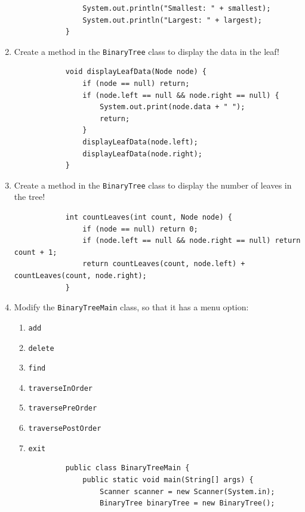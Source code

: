 \documentclass[12pt,titlepage]{article}
\begin{document}
\begin{enumerate}
{\begin{verbatim}
                System.out.println("Smallest: " + smallest);
                System.out.println("Largest: " + largest);
            }
        \end{verbatim}
    }
    \item {
        Create a method in the \texttt{BinaryTree} class to display the data in the leaf!

        \begin{verbatim}
            void displayLeafData(Node node) {
                if (node == null) return;
                if (node.left == null && node.right == null) {
                    System.out.print(node.data + " ");
                    return;
                }
                displayLeafData(node.left);
                displayLeafData(node.right);
            }
        \end{verbatim}
    }
    \pagebreak
    \item {
        Create a method in the \texttt{BinaryTree} class to display the number of leaves in the tree!

        \begin{verbatim}
            int countLeaves(int count, Node node) {
                if (node == null) return 0;
                if (node.left == null && node.right == null) return count + 1;
                return countLeaves(count, node.left) + countLeaves(count, node.right);
            }
        \end{verbatim}
    }
    \item {
        Modify the \texttt{BinaryTreeMain} class, so that it has a menu option:
        \begin{enumerate}[label=\alph*.)]
            \item \texttt{add}
            \item \texttt{delete}
            \item \texttt{find}
            \item \texttt{traverseInOrder}
            \item \texttt{traversePreOrder}
            \item \texttt{traversePostOrder}
            \item \texttt{exit}
        \end{enumerate}

        \begin{verbatim}
            public class BinaryTreeMain {
                public static void main(String[] args) {
                    Scanner scanner = new Scanner(System.in);
                    BinaryTree binaryTree = new BinaryTree();


\end{verbatim}}
\end{enumerate}
\end{document}
